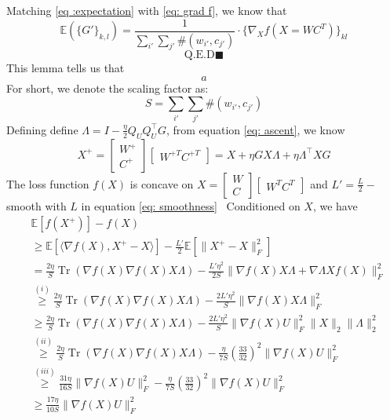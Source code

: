 \documentclass[letterpaper]{article} %
\DeclareMathOperator{\Tr}{Tr} %
\begin{document}
Matching \ref{eq :expectation} with \ref{eq: grad f}, we know that
\begin{equation}
\mathbb{E}(\{G'\}_{k,l})=\frac{1}{\sum_{i'}\sum_{j'} \#(w_{i'}, c_{j'})}\cdot \{\nabla_X f(X=WC^T)\}_{kl} \label{eq: scaling}
\end{equation} 
\[
\text{Q.E.D}\blacksquare
\]
This lemma tells us that 
\begin{equation}
a
\end{equation}
For short, we denote the scaling factor as:
\begin{equation}
S={\sum_{i'}\sum_{j'} \#(w_{i'}, c_{j'})}
\end{equation}
Defining define $\Lambda=I-\frac{\eta}{2}Q_UQ_U^\top G$, from equation \ref{eq: ascent}, we know
\begin{equation}
X^+=\begin{bmatrix}W^+\\C^+\end{bmatrix}\begin{bmatrix}W^{+T}C^{+T}\end{bmatrix}=X+\eta GX\Lambda+\eta\Lambda^\top XG
\end{equation}
The loss function $f(X)$ is concave on $X=\begin{bmatrix}W\\C\end{bmatrix}\begin{bmatrix}W^{T} C^{T}\end{bmatrix}$ and $L'=\frac{L}{2}-$ smooth with $L$ in equation \ref{eq: smoothness}
\
Conditioned on $X$, we have
\begin{equation}
\begin{split}
&\mathbb{E}[f(X^+)]-f(X)\\&\ge \mathbb{E}[\langle \nabla f(X), X^+-X \rangle]-\frac{L'}{2}\mathbb{E}[\|X^+-X\|_F^2] \\
&=\frac{2\eta}{S}\Tr(\nabla f(X)\nabla f(X)X\Lambda)-\frac{L'\eta^2}{2S}\|\nabla f(X)X\Lambda+\nabla \Lambda Xf(X)\|^2_F\\
&\overset{(i)}{\ge}\frac{2\eta}{S}\Tr(\nabla f(X)\nabla f(X)X\Lambda)-\frac{2L'\eta^2}{S}\|\nabla f(X)X\Lambda\|^2_F\\
&\ge\frac{2\eta}{S}\Tr(\nabla f(X)\nabla f(X)X\Lambda)-\frac{2L'\eta^2}{S}\|\nabla f(X)U\|^2_F\|X\|_2\|\Lambda\|^2_2\\
&\overset{(ii)}{\ge}\frac{2\eta}{S}\Tr(\nabla f(X)\nabla f(X)X\Lambda)-\frac{\eta}{7S}(\frac{33}{32})^2\|\nabla f(X)U\|^2_F\\
&\overset{(iii)}{\ge}\frac{31\eta}{16S}\|\nabla f(X)U\|^2_F-\frac{\eta}{7S}(\frac{33}{32})^2\|\nabla f(X)U\|^2_F\\
&\ge\frac{17\eta}{10S}\|\nabla f(X)U\|^2_F
\end{split}
\end{equation}
\end{document}
